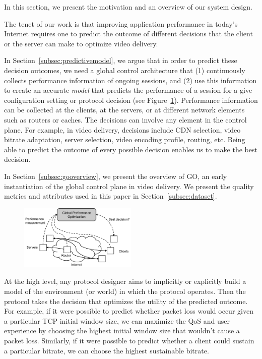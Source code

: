 \label{sec:overview}

In this section, we present the motivation and an overview of our
system design.

The tenet of our work is that improving application performance in
today's Internet requires one to predict the outcome of different
decisions that the client or the server can make to optimize video
delivery. 

In Section~\ref{subsec:predictivemodel}, we argue that 
in order to predict these decision outcomes, we need a global control
architecture that (1) continuously collects performance information 
of ongoing sessions, and (2) use this information to create an accurate 
\emph{model} that predicts the performance of a session for a give 
configuration setting or protocol decision (see Figure~\ref{fig:global-control--overview}). 
Performance information can be collected at the clients, at the servers,
or at different network elements such as routers or caches. 
The decisions can involve any element in the control plane. For example,
in video delivery, decisions include CDN selection, video bitrate adaptation, 
server selection, video encoding profile, routing, etc.
Being able to predict the outcome of every possible decision enables us to make the best
decision.

In Section~\ref{subsec:gooverview}, we present the overview of GO, an 
early instantiation of the global control plane in video delivery.
We present the quality metrics and attributes used in this paper in 
Section~\ref{subsec:dataset}.

\begin{figure}[h!]
\centering
 \includegraphics[width=0.5\textwidth] {figures/global-control-overview.pdf}
\label{fig:global-control--overview}
\end{figure}

\label{subsec:predictivemodel}
At the high level, any protocol designer aims to implicitly or
explicitly build a model of the environment (or world) in which the
protocol operates. Then the protocol takes the decision that optimizes
the utility of the predicted outcome.  For example, if it were
possible to predict whether packet loss would occur given a particular
TCP initial window size, we can maximize the QoS and user experience
by choosing the highest initial window size that wouldn't cause a
packet loss.  Similarly, if it were possible to predict whether a
client could sustain a particular bitrate, we can choose the highest
sustainable bitrate.

